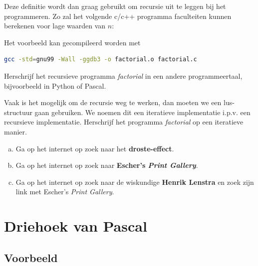 \documentclass[12pt,a4,twoside]{article}
\begin{document}
Deze definitie wordt dan graag gebruikt om recursie uit te leggen bij het programmeren. Zo zal het volgende c/c++ programma faculteiten kunnen berekenen voor lage waarden van $n$:




Het voorbeeld kan gecompileerd worden met
\begin{lstlisting}[language=bash]
  gcc -std=gnu99 -Wall -ggdb3 -o factorial.o factorial.c
\end{lstlisting}

\begin{oefening}
Herschrijf het recursieve programma {\em factorial} in een andere programmeertaal, bijvoorbeeld in Python of Pascal.
\end{oefening}

\begin{oefening}
Vaak is het mogelijk om de recursie weg te werken, dan moeten we een lus-structuur gaan gebruiken. We noemen dit een iteratieve implementatie i.p.v. een recursieve implementatie. Herschrijf het programma {\em factorial} op een iteratieve manier.
\end{oefening}

\begin{oefening}
\begin{enumerate}[(a)]
\item Ga op het internet op zoek naar het {\bf droste-effect}.
\item Ga op het internet op zoek naar {\bf Escher's {\em Print Gallery}}.
\item Ga op het internet op zoek naar de wiskundige {\bf Henrik Lenstra} en zoek zijn link met Escher's {\em Print Gallery}.
\end{enumerate}
\end{oefening}


\pagebreak
\section{Driehoek van Pascal}

\subsection{Voorbeeld}
\end{document}
